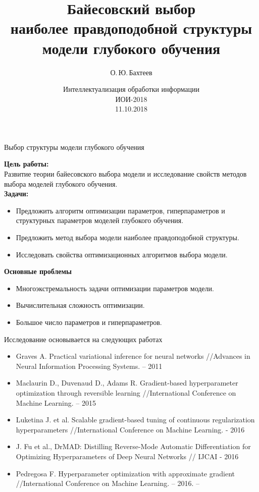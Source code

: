 \documentclass[usenames,dvipsnames,11pt,pdf,utf8,russian,aspectratio=169]{beamer}
\title[Выбор структуры модели]{Байесовский выбор\\ наиболее правдоподобной структуры\\ модели глубокого обучения}
\author{О.\,Ю.\,Бахтеев}
\institute[МФТИ]{Научный руководитель: д.ф.-м.н. В.В. Стрижов\\Московский физико-технический институт (государственный университет)}
\date[2018]{Интеллектуализация обработки информации\\ ИОИ-2018 \\11.10.2018\\}
\begin{document}
\begin{frame}
  \titlepage
\end{frame}



\begin{frame}{Выбор  структуры модели глубокого обучения}

\textbf{Цель работы:}\\
Развитие теории байесовского выбора модели и исследование свойств методов выбора моделей глубокого обучения.\\
\textbf{Задачи:}
\begin{itemize}
\item Предложить алгоритм оптимизации параметров, гиперпараметров и структурных параметров моделей глубокого обучения.
\item Предложить метод выбора модели наиболее правдоподобной структуры.
\item Исследовать свойства оптимизационных алгоритмов выбора модели.
\end{itemize}
\textbf{Основные проблемы}
\begin{itemize}
\item Многоэкстремальность задачи оптимизации параметров модели.
\item Вычислительная сложность оптимизации.
\item Большое число параметров и гиперпараметров.
\end{itemize}

\end{frame}

\begin{frame}{Исследование основывается на следующих работах}
\begin{itemize}
\item Graves A. Practical variational inference for neural networks //Advances in Neural Information Processing Systems. – 2011
\item  Maclaurin D., Duvenaud D., Adams R. Gradient-based hyperparameter optimization through reversible learning //International Conference on Machine Learning. – 2015
\item  Luketina J. et al. Scalable gradient-based tuning of continuous regularization hyperparameters //International Conference on Machine Learning. - 2016
\item J. Fu et al., DrMAD: Distilling Reverse-Mode Automatic Differentiation for Optimizing
Hyperparameters of Deep Neural Networks // IJCAI - 2016
\item Pedregosa F. Hyperparameter optimization with approximate gradient //International Conference on Machine Learning. – 2016. –
\end{itemize}
\end{frame}
\end{document}
